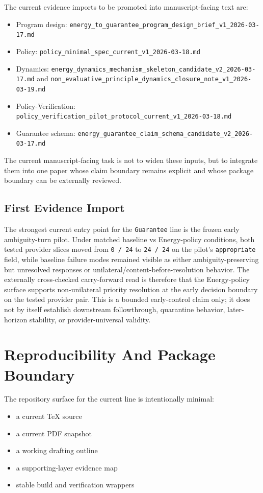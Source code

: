 \documentclass[11pt]{article}
\begin{document}
The current evidence imports to be promoted into manuscript-facing text are:

\begin{itemize}
\item Program design:
  \texttt{energy\_to\_guarantee\_program\_design\_brief\_v1\_2026-03-17.md}
\item Policy:
  \texttt{policy\_minimal\_spec\_current\_v1\_2026-03-18.md}
\item Dynamics:
  \texttt{energy\_dynamics\_mechanism\_skeleton\_candidate\_v2\_2026-03-17.md}
  and
  \texttt{non\_evaluative\_principle\_dynamics\_closure\_note\_v1\_2026-03-19.md}
\item Policy-Verification:
  \texttt{policy\_verification\_pilot\_protocol\_current\_v1\_2026-03-18.md}
\item Guarantee schema:
  \texttt{energy\_guarantee\_claim\_schema\_candidate\_v2\_2026-03-17.md}
\end{itemize}

The current manuscript-facing task is not to widen these inputs, but to integrate
them into one paper whose claim boundary remains explicit and whose package
boundary can be externally reviewed.

\subsection{First Evidence Import}

The strongest current entry point for the \texttt{Guarantee} line is the frozen
early ambiguity-turn pilot. Under matched baseline vs Energy-policy conditions,
both tested provider slices moved from \texttt{0 / 24} to \texttt{24 / 24} on the
pilot's \texttt{appropriate} field, while baseline failure modes remained visible
as either ambiguity-preserving but unresolved responses or
unilateral/content-before-resolution behavior. The externally cross-checked
carry-forward read is therefore that the Energy-policy surface supports
non-unilateral priority resolution at the early decision boundary on the tested
provider pair. This is a bounded early-control claim only; it does not by itself
establish downstream followthrough, quarantine behavior, later-horizon stability,
or provider-universal validity.

\section{Reproducibility And Package Boundary}

The repository surface for the current line is intentionally minimal:
\begin{itemize}
\item a current TeX source
\item a current PDF snapshot
\item a working drafting outline
\item a supporting-layer evidence map
\item stable build and verification wrappers
\end{itemize}
\end{document}
